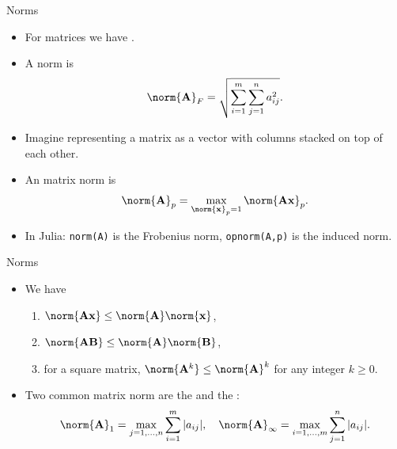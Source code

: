 \documentclass[11pt,xcolor={dvipsnames},aspectratio=159,hyperref={pdftex,pdfpagemode=UseNone,hidelinks,pdfdisplaydoctitle=true},usepdftitle=false]{beamer}
\begin{document}
\begin{frame}{Norms}
    \begin{itemize}
    \item For matrices we have .
    \item A  norm is \begin{align*}
        \norm{\mathbf{A}}_F = \sqrt{\sum_{i=1}^m \sum_{j=1}^n a_{ij}^2}.
    \end{align*}
    \item Imagine representing a matrix as a vector with columns stacked on top of each other.
    \item An  matrix norm is \begin{align*}
        \norm{\mathbf{A}}_p = \max_{\norm{\mathbf{x}}_p = 1} \norm{\mathbf{A}\mathbf{x}}_p.
    \end{align*}
    \item In Julia: \texttt{norm(A)} is the Frobenius norm, \texttt{opnorm(A,p)} is the induced norm.
\end{itemize}
\end{frame}

\begin{frame}{Norms}
    \begin{itemize}
    \item We have \begin{enumerate}
    \item $\norm{\mathbf{A \mathbf{x}}} \leq \norm{\mathbf{A}} \norm{\mathbf{x}}$, 
        \item $\norm{\mathbf{A} \mathbf{B}} \leq \norm{\mathbf{A}}  \norm{\mathbf{B}}$,
        \item for a square matrix, $\norm{\mathbf{A}^k} \leq \norm{\mathbf{A}}^k$ for any integer $k\geq0$.
    \end{enumerate}
    \item Two common matrix norm are the  and the :
    \begin{align*}
        \norm{\mathbf{A}}_1 = \max_{j=1,\ldots,n} \sum_{i=1}^m |a_{ij}|, \quad \norm{\mathbf{A}}_\infty = \max_{i=1,\ldots,m} \sum_{j=1}^n |a_{ij}|.\end{align*}
\end{itemize}
\end{frame}
\end{document}
